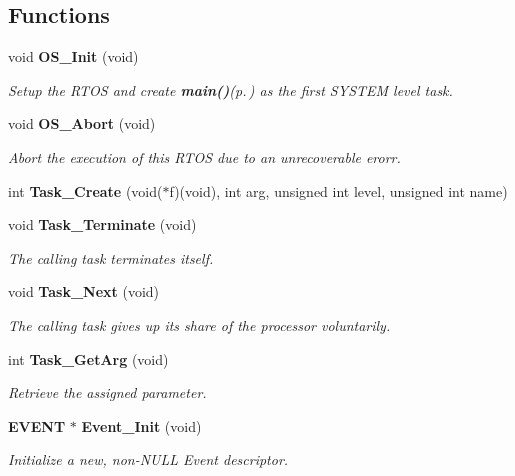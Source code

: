 \subsection*{Functions}
\begin{CompactItemize}
\item 
void {\bf OS\_\-Init} (void)
\begin{CompactList}\small\item\em Setup the RTOS and create {\bf main()}{\rm (p.\,\pageref{_assignment2_8c_840291bc02cba5474a4cb46a9b9566fe})} as the first SYSTEM level task. \item\end{CompactList}\item 
void {\bf OS\_\-Abort} (void)
\begin{CompactList}\small\item\em Abort the execution of this RTOS due to an unrecoverable erorr. \item\end{CompactList}\item 
int {\bf Task\_\-Create} (void($\ast$f)(void), int arg, unsigned int level, unsigned int name)
\item 
void {\bf Task\_\-Terminate} (void)
\begin{CompactList}\small\item\em The calling task terminates itself. \item\end{CompactList}\item 
void {\bf Task\_\-Next} (void)
\begin{CompactList}\small\item\em The calling task gives up its share of the processor voluntarily. \item\end{CompactList}\item 
int {\bf Task\_\-Get\-Arg} (void)
\begin{CompactList}\small\item\em Retrieve the assigned parameter. \item\end{CompactList}\item 
{\bf EVENT} $\ast$ {\bf Event\_\-Init} (void)
\begin{CompactList}\small\item\em Initialize a new, non-NULL Event descriptor. \item\end{CompactList}\item 

\end{CompactItemize}
